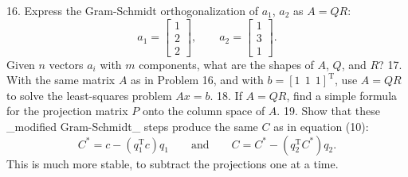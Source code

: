 16. Express the Gram-Schmidt orthogonalization of \(a_{1}\), \(a_{2}\) as \(A=QR\): \[a_{1}=\begin{bmatrix}1\\ 2\\ 2\end{bmatrix},\qquad a_{2}=\begin{bmatrix}1\\ 3\\ 1\end{bmatrix}.\] Given \(n\) vectors \(a_{i}\) with \(m\) components, what are the shapes of \(A\), \(Q\), and \(R\)?
17. With the same matrix \(A\) as in Problem 16, and with \(b=[1\ \ 1\ \ 1]^{\mathrm{T}}\), use \(A=QR\) to solve the least-squares problem \(Ax=b\).
18. If \(A=QR\), find a simple formula for the projection matrix \(P\) onto the column space of \(A\).
19. Show that these _modified Gram-Schmidt_ steps produce the same \(C\) as in equation (10): \[C^{*}=c-(q_{1}^{\mathrm{T}}c)q_{1}\qquad\text{and}\qquad C=C^{*}-(q_{2}^{ \mathrm{T}}C^{*})q_{2}.\] This is much more stable, to subtract the projections one at a time.

 